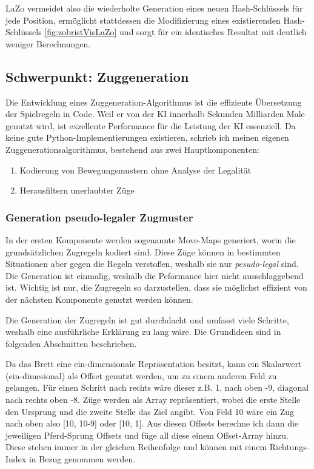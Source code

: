 \documentclass[
  manuscript=article,  %
  layout=publish,  %
  year=2023,
  volume=1,
]{extra/joas}
\begin{document}
LaZo vermeidet also die wiederholte Generation eines neuen Hash-Schlüssels für jede Position, ermöglicht stattdessen die Modifizierung eines existierenden Hash-Schlüssels \ref{fig:zobristVisLaZo}  und sorgt für ein identisches Resultat mit deutlich weniger Berechnungen.

\subsection{Schwerpunkt: Zuggeneration}\label{subsec:zuggeneration}
Die Entwicklung eines Zuggeneration-Algorithmus ist die effiziente Übersetzung der Spielregeln in Code. Weil er von der KI innerhalb Sekunden Milliarden Male genutzt wird, ist exzellente 
Performance für die Leistung der KI essenziell. Da keine gute Python-Implementierungen existieren, schrieb ich meinen eigenen Zuggenerationsalgorithmus, bestehend aus zwei Hauptkomponenten:
\begin{enumerate}
    \item Kodierung von Bewegungsmustern ohne Analyse der Legalität
    \item Herausfiltern unerlaubter Züge
\end{enumerate}

\subsubsection{Generation pseudo-legaler Zugmuster}
In der ersten Komponente werden sogenannte Move-Maps generiert, worin die grundsätzlichen Zugregeln kodiert sind. Diese Züge können in bestimmten Situationen aber gegen die 
Regeln verstoßen, weshalb sie nur \textit{pesudo-legal} sind. Die Generation ist einmalig, weshalb die Peformance hier nicht ausschlaggebend ist. Wichtig ist nur, die Zugregeln so darzustellen, dass sie möglichst effizient von der nächsten Komponente genutzt werden können.

Die Generation der Zugregeln ist gut durchdacht und umfasst viele Schritte, weshalb eine ausführliche Erklärung zu lang wäre. Die Grundideen sind in folgenden Abschnitten beschrieben.

Da das Brett eine ein-dimensionale Repräsentation besitzt, kann ein Skalarwert (ein-dimesional) als Offset genutzt werden, um zu einem anderen Feld zu gelangen. Für einen Schritt nach rechts wäre dieser z.B. 1, nach oben -9, diagonal nach rechts oben -8. Züge werden als Array repräsentiert, wobei die erste Stelle den Ursprung und die zweite Stelle das Ziel angibt. Von Feld 10 wäre ein Zug nach oben also [10, 10-9] oder [10, 1]. Aus diesen Offsets berechne ich dann die jeweiligen Pferd-Sprung Offsets und füge all diese einem Offset-Array hinzu. Diese stehen immer in der gleichen Reihenfolge und können mit einem Richtungs-Index in Bezug genommen werden.
\end{document}
